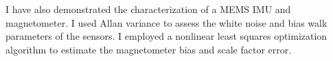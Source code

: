 \documentclass[conference]{IEEEtran}
\begin{document}
I have also demonstrated the characterization of a MEMS IMU and magnetometer. I used Allan variance to assess the white noise and bias walk parameters of the sensors. I employed a nonlinear least squares optimization algorithm to estimate the magnetometer bias and scale factor error. \\




\newpage
{}






\end{document}
